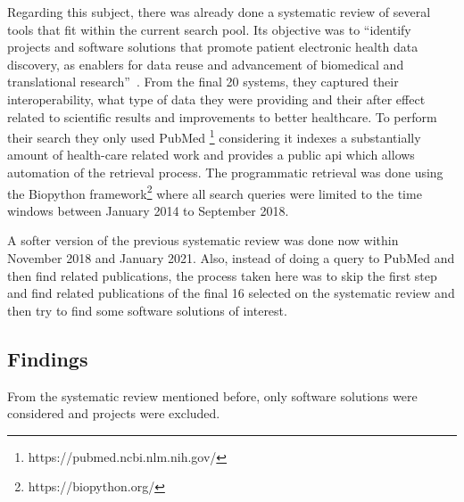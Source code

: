 Regarding this subject, there was already done a systematic review of several tools
that fit within the current search pool.
Its objective was to ``identify projects and software solutions that promote patient
electronic health data discovery, as enablers for data reuse and advancement of
biomedical and translational research''~\cite{systematic_review}.
From the final 20 systems, they captured their interoperability, what type of data they
were providing and their after effect related to scientific results and improvements to
better healthcare.
To perform their search they only used PubMed
\footnote{https://pubmed.ncbi.nlm.nih.gov/} considering it indexes a substantially
amount of health-care related work and provides a public \gls{api} which allows
automation of the retrieval process.
The programmatic retrieval was done using the Biopython
framework\footnote{https://biopython.org/} where all search queries were limited to the
time windows between January 2014 to September 2018.

A softer version of the previous systematic review was done now within November 2018
and January 2021.
Also, instead of doing a query to PubMed and then find related publications, the
process taken here was to skip the first step and find related publications of the
final 16 selected on the systematic review and then try to find some software solutions
of interest.

\subsection{Findings}

From the systematic review mentioned before, only software solutions were considered
and projects were excluded.

